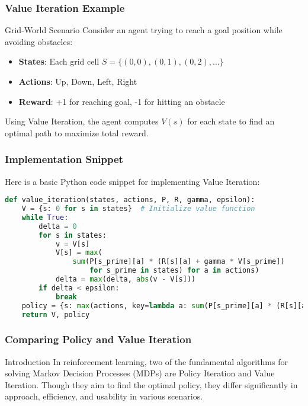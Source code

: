 \documentclass[aspectratio=169]{beamer}
\begin{document}
\begin{frame}[fragile]
    \frametitle{Value Iteration Example}
    \begin{block}{Grid-World Scenario}
        Consider an agent trying to reach a goal position while avoiding obstacles:
        \begin{itemize}
            \item \textbf{States}: Each grid cell \( S = \{(0,0), (0,1), (0,2), \ldots\} \)
            \item \textbf{Actions}: Up, Down, Left, Right
            \item \textbf{Reward}: +1 for reaching goal, -1 for hitting an obstacle
        \end{itemize}
    \end{block}
    Using Value Iteration, the agent computes \( V(s) \) for each state to find an optimal path to maximize total reward.
\end{frame}

\begin{frame}[fragile]
    \frametitle{Implementation Snippet}
    Here is a basic Python code snippet for implementing Value Iteration:
    \begin{lstlisting}[language=Python]
def value_iteration(states, actions, P, R, gamma, epsilon):
    V = {s: 0 for s in states}  # Initialize value function
    while True:
        delta = 0
        for s in states:
            v = V[s]
            V[s] = max(
                sum(P[s_prime][a] * (R[s][a] + gamma * V[s_prime])
                    for s_prime in states) for a in actions)
            delta = max(delta, abs(v - V[s]))
        if delta < epsilon:
            break
    policy = {s: max(actions, key=lambda a: sum(P[s_prime][a] * (R[s][a] + gamma * V[s_prime]) for s_prime in states)) for s in states}
    return V, policy
    \end{lstlisting}
\end{frame}

\begin{frame}[fragile]
    \frametitle{Comparing Policy and Value Iteration}
    \begin{block}{Introduction}
        In reinforcement learning, two of the fundamental algorithms for solving Markov Decision Processes (MDPs) are Policy Iteration and Value Iteration. Though they aim to find the optimal policy, they differ significantly in approach, efficiency, and usability in various scenarios.
    \end{block}
\end{frame}
\end{document}
